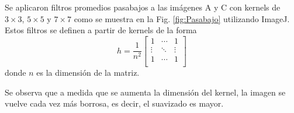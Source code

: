 \documentclass[11pt,twocolumn,twoside]{opticajnl}
\begin{document}
\vspace{0.3cm}

Se aplicaron filtros promedios pasabajos a las imágenes A y C con kernels de $3\times3$, $5\times5$ y $7\times7$ como se muestra en la Fig. \ref{fig:Pasabajo} utilizando ImageJ. Estos filtros se definen a partir de kernels de la forma 
\begin{equation}
    h = \frac{1}{n^2} 
    \begin{bmatrix}
    1 & \cdots & 1 \\
    \vdots & \ddots & \vdots \\
    1 & \cdots & 1 \\
    \end{bmatrix}
\end{equation}
donde $n$ es la dimensión de la matriz. 

Se observa que a medida que se aumenta la dimensión del kernel, la imagen se vuelve cada vez más borrosa, es decir, el suavizado es mayor.
\end{document}
